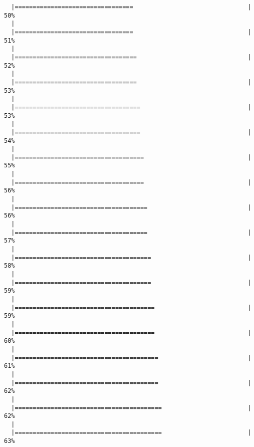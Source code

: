 \documentclass[a4paper]{article}
\begin{document}
\begin{verbatim}
  |=================================                                |  50%
  |                                                                       
  |=================================                                |  51%
  |                                                                       
  |==================================                               |  52%
  |                                                                       
  |==================================                               |  53%
  |                                                                       
  |===================================                              |  53%
  |                                                                       
  |===================================                              |  54%
  |                                                                       
  |====================================                             |  55%
  |                                                                       
  |====================================                             |  56%
  |                                                                       
  |=====================================                            |  56%
  |                                                                       
  |=====================================                            |  57%
  |                                                                       
  |======================================                           |  58%
  |                                                                       
  |======================================                           |  59%
  |                                                                       
  |=======================================                          |  59%
  |                                                                       
  |=======================================                          |  60%
  |                                                                       
  |========================================                         |  61%
  |                                                                       
  |========================================                         |  62%
  |                                                                       
  |=========================================                        |  62%
  |                                                                       
  |=========================================                        |  63%

\end{verbatim}
\end{document}
